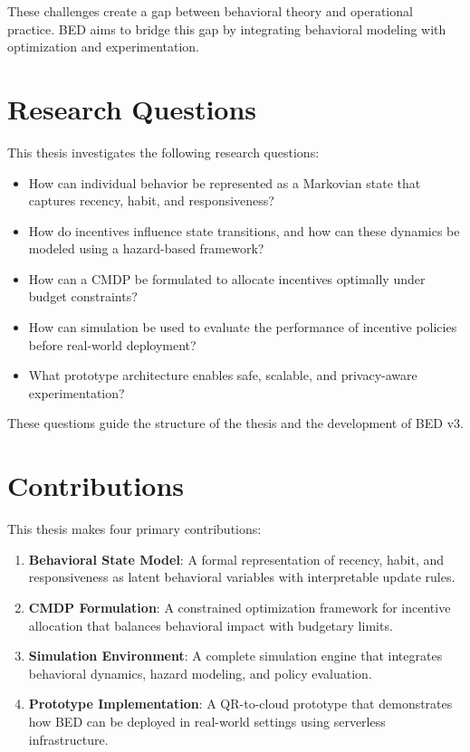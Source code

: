 These challenges create a gap between behavioral theory and operational
practice. BED aims to bridge this gap by integrating behavioral modeling with
optimization and experimentation.

\section{Research Questions}

This thesis investigates the following research questions:

\begin{itemize}
    \item How can individual behavior be represented as a Markovian state that
    captures recency, habit, and responsiveness?
    \item How do incentives influence state transitions, and how can these
    dynamics be modeled using a hazard-based framework?
    \item How can a CMDP be formulated to allocate incentives optimally under
    budget constraints?
    \item How can simulation be used to evaluate the performance of incentive
    policies before real-world deployment?
    \item What prototype architecture enables safe, scalable, and privacy-aware
    experimentation?
\end{itemize}

These questions guide the structure of the thesis and the development of BED v3.

\section{Contributions}

This thesis makes four primary contributions:

\begin{enumerate}
    \item \textbf{Behavioral State Model}: A formal representation of recency,
    habit, and responsiveness as latent behavioral variables with interpretable
    update rules.
    \item \textbf{CMDP Formulation}: A constrained optimization framework for
    incentive allocation that balances behavioral impact with budgetary limits.
    \item \textbf{Simulation Environment}: A complete simulation engine that
    integrates behavioral dynamics, hazard modeling, and policy evaluation.
    \item \textbf{Prototype Implementation}: A QR-to-cloud prototype that
    demonstrates how BED can be deployed in real-world settings using
    serverless infrastructure.
\end{enumerate}

